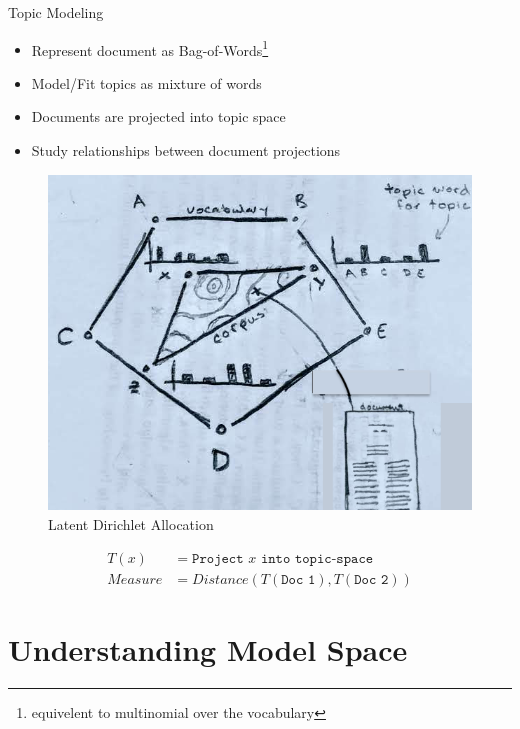 \documentclass[10pt]{beamer}
\begin{document}
\begin{frame}{Topic Modeling}

  \begin{multicols}{2}

  \begin{itemize}
  \item Represent document as Bag-of-Words\footnote{equivelent to multinomial over the vocabulary}
  \item Model/Fit topics as mixture of words
  \item Documents are projected into topic space
  \item Study relationships between document projections
  \end{itemize}

  \begin{figure}
  \includegraphics[width=\columnwidth]{./lda-draw.png}
  \caption{Latent Dirichlet Allocation}
  \end{figure}

  \end{multicols}

  \begin{align*}
    T(x) &= \texttt{Project $x$ into topic-space} \\
    Measure &= Distance(T(\texttt{Doc 1}),T(\texttt{Doc 2}))
  \end{align*}

\end{frame}

\section{Understanding Model Space}
\end{document}
